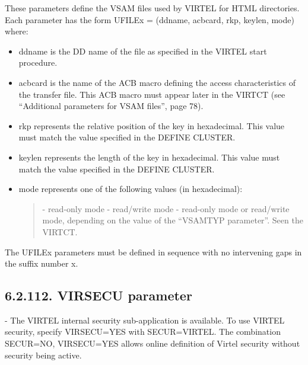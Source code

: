 \documentclass[letterpaper,10pt,english]{sphinxmanual}
\begin{document}
These parameters define the VSAM files used by VIRTEL for HTML directories. Each parameter has the form UFILEx = (ddname, acbcard, rkp, keylen, mode) where:
\begin{itemize}
\item {} 
ddname is the DD name of the file as specified in the VIRTEL start procedure.

\item {} 
acbcard is the name of the ACB macro defining the access characteristics of the transfer file. This ACB macro must appear later in the VIRTCT (see “Additional parameters for VSAM files”, page 78).

\item {} 
rkp represents the relative position of the key in hexadecimal. This value must match the value specified in the DEFINE CLUSTER.

\item {} 
keylen represents the length of the key in hexadecimal. This value must match the value specified in the DEFINE CLUSTER.

\item {} 
mode represents one of the following values (in hexadecimal):
\begin{quote}

 - read-only mode
 - read/write mode
 - read-only mode or read/write mode, depending on the value of the “VSAMTYP parameter”. Seen the VIRTCT.
\end{quote}

\end{itemize}

The UFILEx parameters must be defined in sequence with no intervening gaps in the suffix number x.


\subsection{6.2.112. VIRSECU parameter}
\label{\detokenize{Installation_Guide:virsecu-parameter}}
\begin{sphinxVerbatim}[commandchars=\\\{\}]
 
\end{sphinxVerbatim}

 - The VIRTEL internal security sub-application is available. To use VIRTEL security, specify VIRSECU=YES with SECUR=VIRTEL. The combination SECUR=NO, VIRSECU=YES allows online definition of Virtel security without security being active.
\end{document}
